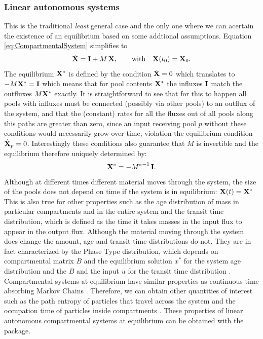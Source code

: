 \subsubsection{Linear autonomous systems}
This is the traditional \emph{least} general case and the only one
where we can acertain the existence of an equilibrium based on some addtional assumptions.
Equation \eqref{eq:CompartmentalSystem} simplifies to
\begin{equation} \label{eq:LS}
\dot{\mathbf{X}} = \mathbf{I} + M \, \mathbf{X}, \qquad  \mathrm{with} \quad \mathbf{X}(t_0) = \mathbf{X}_0.
\end{equation}
The equilibrium $\mathbf{X}^*$ is defined by the
condition  $\dot{\mathbf{X}}=0$ which translates to $-M \mathbf{X}^*= \mathbf{I}$ which means that for
pool contents $\mathbf{X}^*$ the influxes $\mathbf{I}$ match the outfluxes $M \mathbf{X}^*$ exactly.  It is
straightforward to see that for this to happen all 
pools with influxes must be connected (possibly via other pools) to an outflux of
the system, and that the (constant) rates for all the fluxes out of all
pools along this paths are greater than zero, since an input receiving pool $p$
without these conditions would necessarily grow over time, violation the
equilibrium condition $\dot{\mathbf{X}}_p=0$. Interestingly these conditions also
guarantee that $M$ is invertible and the equilibrium therefore uniquely
determined by: 
\begin{equation} 
\label{eq:x_Minv_I}
\mathbf{X}^* = - {M^*}^{-1} \, \mathbf{I}.  
\end{equation}
Although at different times different material moves through the system, the
size of the pools does not depend on time if the system is in
equilibrium: $\mathbf{X}(t)=\mathbf{X}^*$ 
This is also true for other properties such as the
age distribution of mass in particular compartments and in the entire system
and the transit time distribution, which is defined as the time it takes masses
in the input flux to appear in the output flux. 
Although the material moving through the system does change the amount, age and transit
time distributions do not. 
They are in fact characterized by the Phase Type
distribution, which depends on compartmental matrix $B$ and the equilibrium
solution $x^*$ for the system age distribution and the $B$ and the input $u$
for the transit time distribution \cite{Metzler2018MGS}.
Compartmental systems at equilibrium have similar properties as continuous-time absorbing Markov Chains \cite{Metzler2018MGS}.
Therefore, we can obtain other quantities of interest such as  the path entropy of particles that travel across the system and the occupation time of particles inside compartments \cite{Metzler2020}. These properties of linear autonomous compartmental systems at equilibrium can be obtained with the \LAPM{} package.

